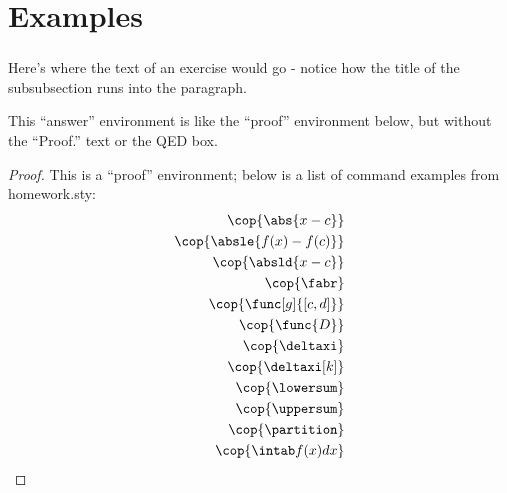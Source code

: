 \section*{Examples}

\setcounter{section}{7} %
\setcounter{subsection}{2} %
\setcounter{subsubsection}{4} %
\subsubsection{} %
Here's where the text of an exercise would go - notice how the title of the subsubsection runs into the paragraph.

    
    \begin{answer}
        This ``answer'' environment is like the ``proof'' environment below, 
        but without the ``Proof.'' text or the QED box.
    \end{answer}

    \begin{proof}
    
        This is a ``proof'' environment; below is a list of command examples from homework.sty:
        \begin{align*}
            \cop{\abs{x-c}} \\
            \cop{\absle{f(x)-f(c)}} \\
            \cop{\absld{x-c}} \\
            \cop{\fabr} \\
            \cop{\func[g]{[c,d]}} \\
            \cop{\func{D}} \\
            \cop{\deltaxi} \\
            \cop{\deltaxi[k]} \\
            \cop{\lowersum} \\
            \cop{\uppersum} \\
            \cop{\partition} \\
            \cop{\intab f(x)dx}
        \end{align*}
    
    \end{proof}
